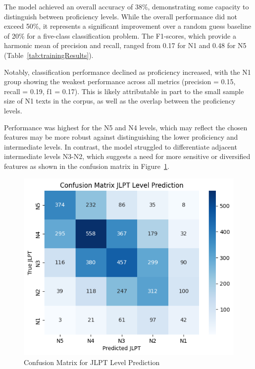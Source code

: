 The model achieved an overall accuracy of 38\%, demonstrating some capacity to distinguish between proficiency
levels.
While the overall performance did not exceed 50\%, it represents a significant improvement over a random guess
baseline of 20\% for a five-class classification problem. The F1-scores, which provide a harmonic mean of precision
and recall, ranged from 0.17 for N1 and 0.48 for N5 (Table~\ref{tab:trainingResults}).

Notably, classification performance declined as proficiency increased, with the N1 group showing the weakest
performance across all metrics (precision = 0.15, recall = 0.19, f1 = 0.17). This is likely attributable in part to the
small sample size of N1 texts in the corpus, as well as the overlap between the proficiency levels.

Performance was highest for the N5 and N4 levels, which may reflect the chosen features may be more robust against
distinguishing the lower proficiency and intermediate levels. In contrast, the model struggled to differentiate
adjacent intermediate levels N3-N2, which suggests a need for more sensitive or diversified features as shown in the
confusion matrix in Figure~\ref{fig:conMA}.

\begin{figure}[h!]
           \centering
           \includegraphics[scale=.4]{img/confusionMatrix}
           \caption[Confusion Matrix for JLPT Level Prediction]{Confusion Matrix for JLPT Level Prediction}
           \label{fig:conMA}
\end{figure}

